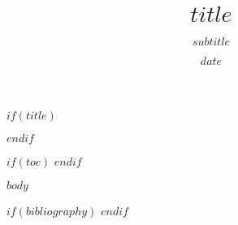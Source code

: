 \documentclass[12pt]{article}
\title{$title$}
\subtitle{$subtitle$}
\author{$for(author)$$author.name$$if(author.affiliation)$\\$author.affiliation$$endif$$sep\\$endfor$}
\date{$date$}
\begin{document}
$if(title)$
  \maketitle
$endif$

$if(toc)$
  {\setcounter{tocdepth}{2}\tableofcontents}
  \newpage
$endif$

$body$

$if(bibliography)$
  \clearpage
$endif$
\end{document}
